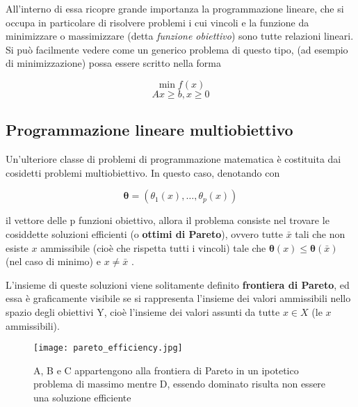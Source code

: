 All'interno di essa ricopre 
grande importanza la programmazione lineare, che si occupa in particolare di risolvere 
problemi i cui vincoli e la funzione da minimizzare o massimizzare (detta 
\textit{funzione obiettivo}) sono tutte relazioni lineari\cite{walsh1985introduction}.
Si può facilmente vedere come un generico problema di questo tipo, (ad esempio di minimizzazione) 
possa essere scritto nella forma\cite{1990}

\begin{equation*}
    \min f(x)
    \label{eq:}
\end{equation*}
\begin{equation*}
    Ax \geq b, x \geq 0
    \label{eq:}
\end{equation*}

\subsection{Programmazione lineare multiobiettivo}
\label{section:lin_programming_mo}

Un'ulteriore classe di problemi di programmazione matematica è costituita dai cosidetti
problemi multiobiettivo. In questo caso, denotando con 

\begin{equation*}
    \mathbf{\theta} = (\theta_1(x), \dots, \theta_p(x))
    \label{eq:}
\end{equation*}

il vettore delle p funzioni obiettivo, allora il problema consiste nel trovare le 
cosiddette soluzioni efficienti (o \textbf{ottimi di Pareto}), ovvero tutte $\bar{x}$ tali 
che non esiste $x$ ammissibile (cioè che rispetta tutti i vincoli) tale che 
$\mathbf{\theta}(x) \leq \mathbf{\theta}(\bar{x})$ (nel caso di minimo) e 
$x \neq \bar{x}$ \cite{walsh1985introduction}.

L'insieme di queste soluzioni viene solitamente definito \textbf{frontiera di Pareto}, 
ed essa è graficamente visibile se si rappresenta l'insieme dei valori ammissibili nello 
spazio degli obiettivi Y, cioè l'insieme dei valori assunti da tutte $x \in X$ 
(le $x$ ammissibili).

\begin{figure}
    \begin{small}
        \begin{center}
            \texttt{[image: pareto\_efficiency.jpg]}
        \end{center}
        \caption{A, B e C appartengono alla frontiera di Pareto
            in un ipotetico problema di massimo mentre D, essendo dominato
            risulta non essere una soluzione efficiente \cite{Pettinger2017}}
        \label{fig:obj}
    \end{small}
\end{figure}

